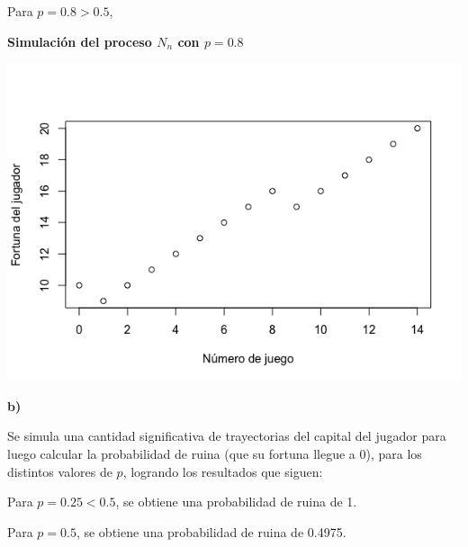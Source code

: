 \documentclass[11pt]{article}
\begin{document}

Para $p = 0.8 > 0.5$,

\begin{center}\large\textbf{Simulación del proceso $N_n$ con $p = 0.8$}\end{center}
\vspace{-0.9cm}
\begin{center}\includegraphics[scale = 0.5]{fortuna3.png}\end{center}



\textbf{b)}

Se simula una cantidad significativa de trayectorias del capital del jugador para luego calcular la probabilidad de ruina (que su fortuna llegue a 0), para los distintos valores de $p$, logrando los resultados que siguen:

Para $p = 0.25 < 0.5$, se obtiene una probabilidad de ruina de 1.

Para $p = 0.5$, se obtiene una probabilidad de ruina de 0.4975.
\end{document}
